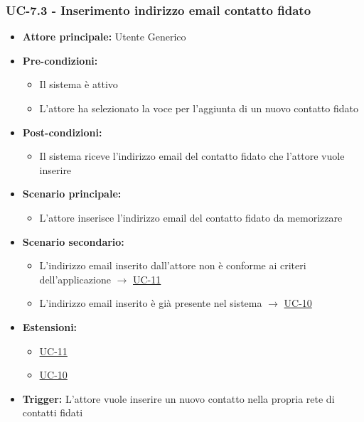 \documentclass[a4paper,12pt]{article}
\begin{document}
\subsubsection{UC-7.3 - Inserimento indirizzo email contatto fidato} \label{subsec:UC-7.3}
\begin{itemize}
    \item \textbf{Attore principale:} Utente Generico
    \item \textbf{Pre-condizioni:}
    \begin{itemize}
        \item Il sistema è attivo
        \item L'attore ha selezionato la voce per l'aggiunta di un nuovo contatto fidato
    \end{itemize}
    \item \textbf{Post-condizioni:} 
    \begin{itemize}
        \item Il sistema riceve l'indirizzo email del contatto fidato che l'attore vuole inserire
    \end{itemize}
    \item \textbf{Scenario principale:} 
    \begin{itemize}
        \item L'attore inserisce l'indirizzo email del contatto fidato da memorizzare
    \end{itemize}
    \item \textbf{Scenario secondario:}
    \begin{itemize}
        \item L'indirizzo email inserito dall'attore non è conforme ai criteri dell'applicazione $\rightarrow$ \hyperref[subsec:UC-11]{UC-11}
        \item L'indirizzo email inserito è già presente nel sistema $\rightarrow$ \hyperref[subsec:UC-10]{UC-10}
    \end{itemize}
    \item \textbf{Estensioni:} 
    \begin{itemize}
        \item \hyperref[subsec:UC-11]{UC-11}
        \item \hyperref[subsec:UC-10]{UC-10}
    \end{itemize}
    \item \textbf{Trigger:} L'attore vuole inserire un nuovo contatto nella propria rete di contatti fidati
\end{itemize}
\end{document}
